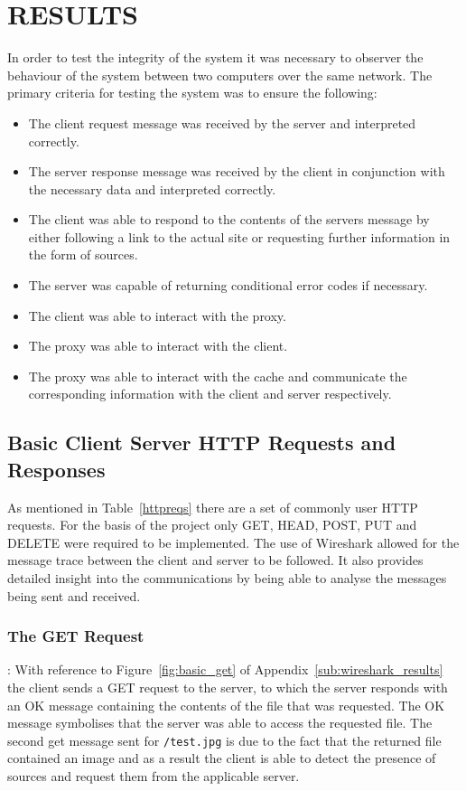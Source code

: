 \documentclass[10pt,twocolumn]{witseiepaper}
\begin{document}
\section{RESULTS}

	In order to test the integrity of the system it was necessary to observer the behaviour of the system between two computers over the same network. The primary criteria for testing the system was to ensure the following:

	\begin{itemize}
		\item The client request message was received by the server and interpreted correctly.
		\item The server response message was received by the client in conjunction with the necessary data and interpreted correctly.
		\item The client was able to respond to the contents of the servers message by either following a link to the actual site or requesting further information in the form of sources.
		\item The server was capable of returning conditional error codes if necessary.
		\item The client was able to interact with the proxy.
		\item The proxy was able to interact with the client.
		\item The proxy was able to interact with the cache and communicate the corresponding information with the client and server respectively.
	\end{itemize}

	\subsection{Basic Client Server HTTP Requests and Responses} %
	\label{sub:basic_client_server}
		
		As mentioned in Table~\ref{httpreqs} there are a set of commonly user HTTP requests. For the basis of the project only GET, HEAD, POST, PUT and DELETE were required to be implemented. The use of Wireshark allowed for the message trace between the client and server to be followed. It also provides detailed insight into the communications by being able to analyse the messages being sent and received.
		
		\subsubsection*{The GET Request}: With reference to Figure~\ref{fig:basic_get} of Appendix~\ref{sub:wireshark_results} the client sends a GET request to the server, to which the server responds with an OK message containing the contents of the file that was requested. The OK message symbolises that the server was able to access the requested file. The second get message sent for \texttt{/test.jpg} is due to the fact that the returned file contained an image and as a result the client is able to detect the presence of sources and request them from the applicable server. \\
		
\end{document}

